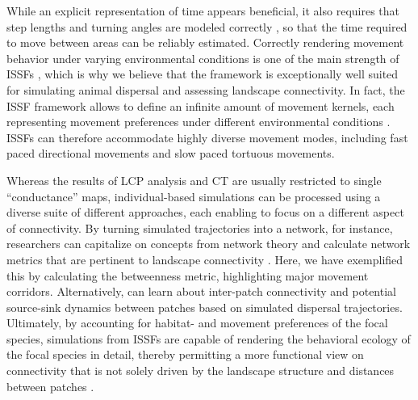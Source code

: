 \documentclass[abstract=on,10pt,a4paper,bibliography=totocnumbered]{article}
\begin{document}
While an explicit representation of time appears beneficial, it also requires
that step lengths and turning angles are modeled correctly
\citep{Kanagaraj.2013}, so that the time required to move between areas can be
reliably estimated. Correctly rendering movement behavior under varying
environmental conditions is one of the main strength of ISSFs \citep{Avgar.2016,
Prokopenko.2017, Fieberg.2020}, which is why we believe that the framework is
exceptionally well suited for simulating animal dispersal and assessing
landscape connectivity. In fact, the ISSF framework allows to define an infinite
amount of movement kernels, each representing movement preferences under
different environmental conditions \citep{Fieberg.2020}. ISSFs can therefore
accommodate highly diverse movement modes, including fast paced directional
movements and slow paced tortuous movements.

Whereas the results of LCP analysis and CT are usually restricted to single
``conductance'' maps, individual-based simulations can be processed using a
diverse suite of different approaches, each enabling to focus on a different
aspect of connectivity. By turning simulated trajectories into a network, for
instance, researchers can capitalize on concepts from network theory and
calculate network metrics that are pertinent to landscape connectivity
\citep{BastilleRousseau.2018}. Here, we have exemplified this by calculating the
betweenness metric, highlighting major movement corridors. Alternatively, can
learn about inter-patch connectivity and potential source-sink dynamics between
patches \citep{Ferreras.2001, Revilla.2004, Kanagaraj.2013} based on simulated
dispersal trajectories. Ultimately, by accounting for habitat- and movement
preferences of the focal species, simulations from ISSFs are capable of
rendering the behavioral ecology of the focal species in detail, thereby
permitting a more functional view on connectivity that is not solely driven by
the landscape structure and distances between patches \citep{Gustafson.1996,
Gardner.2004, Graf.2007, KramerSchadt.2004, Revilla.2004, Revilla.2008,
Kanagaraj.2013}.
\end{document}
